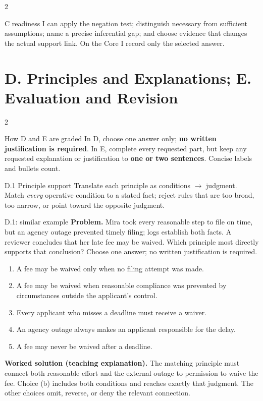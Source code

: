 \documentclass[10pt]{extarticle}
\begin{document}
\begin{multicols}{2}
\begin{checklistbox}{C readiness}
I can apply the negation test; distinguish necessary from sufficient assumptions;
name a precise inferential gap; and choose evidence that changes the actual
support link. On the Core I record only the selected answer.
\end{checklistbox}
\end{multicols}

\clearpage
\small
{}
\section*{D. Principles and Explanations; E. Evaluation and Revision}
\begin{multicols}{2}
\begin{definitionbox}{How D and E are graded}
In D, choose one answer only; \textbf{no written justification is required}.
In E, complete every requested part, but keep any requested explanation or
justification to \textbf{one or two sentences}. Concise labels and bullets count.
\end{definitionbox}

\begin{methodbox}{D.1 Principle support}
Translate each principle as conditions $\to$ judgment. Match \emph{every}
operative condition to a stated fact; reject rules that are too broad, too narrow,
or point toward the opposite judgment.
\end{methodbox}
\begin{workedbox}{D.1: similar example}
\textbf{Problem.} Mira took every reasonable step to file on time, but an agency outage prevented timely filing; logs establish both facts. A reviewer concludes that her late fee may be waived. Which principle most directly supports that conclusion? Choose one answer; no written justification is required.

\begin{enumerate}[label=(\alph*)]
\item A fee may be waived only when no filing attempt was made.
\item A fee may be waived when reasonable compliance was prevented by circumstances outside the applicant's control.
\item Every applicant who misses a deadline must receive a waiver.
\item An agency outage always makes an applicant responsible for the delay.
\item A fee may never be waived after a deadline.
\end{enumerate}
\textbf{Worked solution (teaching explanation).} The matching principle must connect both reasonable effort and the external outage to permission to waive the fee. Choice (b) includes both conditions and reaches exactly that judgment. The other choices omit, reverse, or deny the relevant connection.


\end{workedbox}
\end{multicols}
\end{document}
